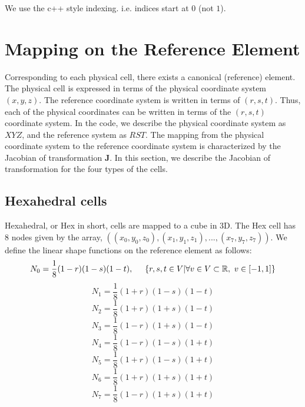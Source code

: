 \begin{note}
	We use the c++ style indexing. i.e. indices start at $0$ (not $1$).
\end{note}

\section{Mapping on the Reference Element}
Corresponding to each physical cell, there exists a canonical (reference) element.
The physical cell is expressed in terms of the physical coordinate system $(x,y,z)$. The reference coordinate system is
written in terms of  $(r,s,t)$. 
Thus, each of the physical coordinates can be written in terms of the $(r,s,t)$ coordinate system. In the code, we 
describe the physical coordinate system as $XYZ$, and the reference system as $RST$. 
The mapping from the physical coordinate system to the reference coordinate system is characterized by the Jacobian of 
transformation $\mathbf{J}$. 
In this section, we describe the Jacobian of transformation for the four types of the cells.

\subsection{Hexahedral cells}
Hexahedral, or Hex in short, cells are mapped to a cube in 3D. The Hex cell has $8$ nodes given by the array,
$\left((x_0,y_0,z_0), (x_1, y_1, z_1), ... ,(x_7,y_7,z_7)\right)$.
We define the linear shape functions on the reference element as follows:
\begin{equation}\label{shape0}
	N_0 = \frac{1}{8} (1-r) (1-s) (1-t), \hspace{5mm} \{r,s,t \in V | \forall v\in V \subset  {\mathbb{R}} , ~ v \in [-1,1]\}
\end{equation}
\begin{equation}\label{shape1}
	N_1 = \frac{1}{8} (1+r) (1-s) (1-t) 
\end{equation}
\begin{equation}\label{shape2}
	N_2 = \frac{1}{8} (1+r) (1+s) (1-t) 
\end{equation}
\begin{equation}\label{shape3}
	N_3 = \frac{1}{8} (1-r) (1+s) (1-t) 
\end{equation}
\begin{equation}\label{shape4}
	N_4 = \frac{1}{8} (1-r) (1-s) (1+t) 
\end{equation}
\begin{equation}\label{shape5}
	N_5 = \frac{1}{8} (1+r) (1-s) (1+t) 
\end{equation}
\begin{equation}\label{shape6}
	N_6 = \frac{1}{8} (1+r) (1+s) (1+t) 
\end{equation}
\begin{equation}\label{shape7}
	N_7 = \frac{1}{8} (1-r) (1+s) (1+t) 
\end{equation}

